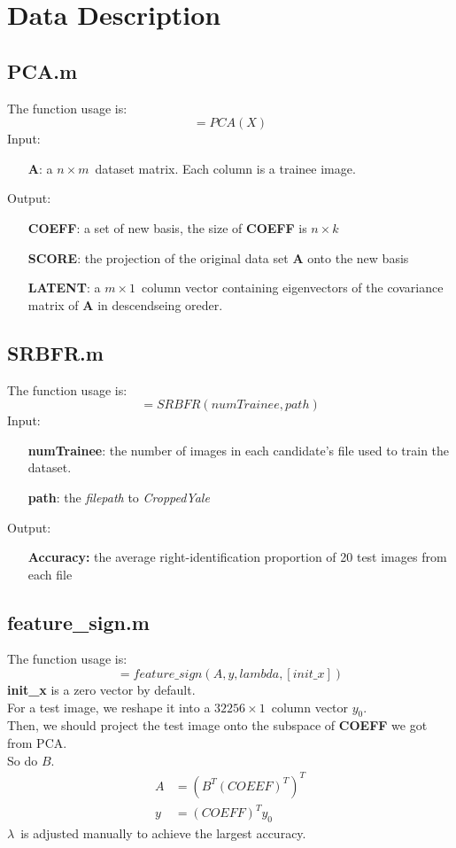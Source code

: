 \section{Data Description}
\subsection{PCA.m}
The function usage is:
\begin{displaymath}
	[COEFF, SCORE, LATENT] = PCA(X)
\end{displaymath}
Input:
\begin{itemize}
	\item[\textbf{A}:] a \(n\times m\)\ dataset matrix. Each column is a trainee image.
\end{itemize}
Output:
\begin{itemize}
	\item[\textbf{COEFF}:] a set of new basis, the size of \textbf{COEFF} is \(n\times k\)
	\item[\textbf{SCORE}:] the projection of the original data set \textbf{A} onto the new basis
	\item[\textbf{LATENT}:] a \(m\times1\)\ column vector containing eigenvectors of the covariance matrix of \textbf{A} in descendseing oreder.
\end{itemize}
\subsection{SRBFR.m}
The function usage is:
\begin{displaymath}
	[Accuracy] = SRBFR(numTrainee, path)
\end{displaymath}
Input:
\begin{itemize}
	\item[\textbf{numTrainee}:] the number of images in each candidate's file used to train the dataset.
	\item[\textbf{path}:] the \emph{filepath} to \emph{CroppedYale}
\end{itemize}
Output:
\begin{itemize}
	\item[\textbf{Accuracy:}] the average right-identification proportion of 20 test images from each file
\end{itemize}
\subsection{feature\_sign.m}
The function usage is:
\begin{displaymath}
	[x] = feature\_sign(A, y, lambda, [init\_x])
\end{displaymath}
\textbf{init\_x} is a zero vector by default.
\\
For a test image, we reshape it into a \(32256\times 1\)\ column vector \(y_0\).
\\
Then, we should project the test image onto the subspace of \textbf{COEFF} we got from PCA.
\\
So do \(B\).
\[
	\begin{split}
		A &= (B^{T}(COEEF)^{T})^{T}
		\\
		y &= (COEFF)^{T}y_{0}
	\end{split}
\]
\(\lambda\)\ is adjusted manually to achieve the largest accuracy.
